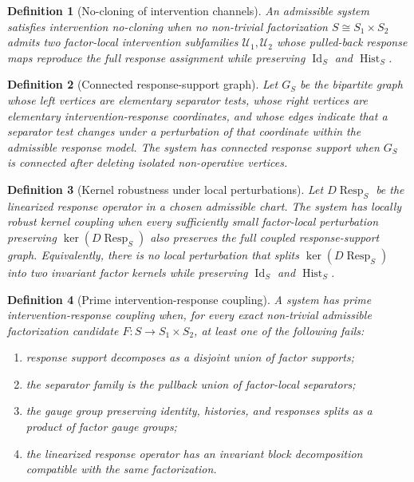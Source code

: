 \documentclass[11pt]{article}
\newtheorem{definition}{Definition}[section]
\newcommand{\Id}{\operatorname{Id}}
\newcommand{\Hist}{\operatorname{Hist}}
\newcommand{\Resp}{\operatorname{Resp}}
\begin{document}
\begin{definition}[No-cloning of intervention channels]
An admissible system satisfies intervention no-cloning when no non-trivial factorization $S\cong S_1\times S_2$ admits two factor-local intervention subfamilies $\mathcal U_1,\mathcal U_2$ whose pulled-back response maps reproduce the full response assignment while preserving $\Id_S$ and $\Hist_S$.
\end{definition}

\begin{definition}[Connected response-support graph]
Let $G_S$ be the bipartite graph whose left vertices are elementary separator tests, whose right vertices are elementary intervention-response coordinates, and whose edges indicate that a separator test changes under a perturbation of that coordinate within the admissible response model. The system has connected response support when $G_S$ is connected after deleting isolated non-operative vertices.
\end{definition}

\begin{definition}[Kernel robustness under local perturbations]
Let $D\Resp_S$ be the linearized response operator in a chosen admissible chart. The system has locally robust kernel coupling when every sufficiently small factor-local perturbation preserving $\ker(D\Resp_S)$ also preserves the full coupled response-support graph. Equivalently, there is no local perturbation that splits $\ker(D\Resp_S)$ into two invariant factor kernels while preserving $\Id_S$ and $\Hist_S$.
\end{definition}

\begin{definition}[Prime intervention-response coupling]
A system has prime intervention-response coupling when, for every exact non-trivial admissible factorization candidate $F:S\to S_1\times S_2$, at least one of the following fails:
\begin{enumerate}[label=(\roman*)]
  \item response support decomposes as a disjoint union of factor supports;
  \item the separator family is the pullback union of factor-local separators;
  \item the gauge group preserving identity, histories, and responses splits as a product of factor gauge groups;
  \item the linearized response operator has an invariant block decomposition compatible with the same factorization.
\end{enumerate}
\end{definition}
\end{document}
